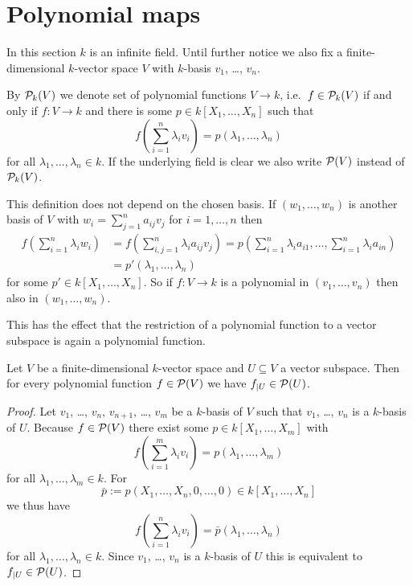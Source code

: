




\section{Polynomial maps}


In this section $k$ is an infinite field. Until further notice we also fix a finite-dimensional $k$-vector space $V$ with $k$-basis $v_1$, \dots, $v_n$.


\begin{defi}
 By $\mathcal{P}_k(V)$ we denote set of polynomial functions $V \to k$, i.e.\ $f \in \mathcal{P}_k(V)$ if and only if $f \colon V \to k$ and there is some $p \in k[X_1, \dotsc, X_n]$ such that
 \[
  f\left( \sum_{i=1}^n \lambda_i v_i \right) = p(\lambda_1, \dotsc, \lambda_n)
 \]
 for all $\lambda_1, \dotsc, \lambda_n \in k$. If the underlying field is clear we also write $\mathcal{P}(V)$ instead of $\mathcal{P}_k(V)$.
\end{defi}


This definition does not depend on the chosen basis. If $(w_1, \dotsc, w_n)$ is another basis of $V$ with $w_i = \sum_{j=1}^n a_{ij} v_j$ for $i = 1, \dotsc, n$ then
\begin{align*}
 f\left( \sum_{i=1}^n \lambda_i w_i \right)
 &= f\left( \sum_{i,j=1}^n \lambda_i a_{ij} v_j \right)
 = p\left( \sum_{i=1}^n \lambda_i a_{i1}, \dotsc, \sum_{i=1}^n \lambda_{i} a_{in} \right)\\
 &= p'(\lambda_1, \dotsc, \lambda_n)
\end{align*}
for some $p' \in k[X_1, \dotsc, X_n]$. So if $f \colon V \to k$ is a polynomial in $(v_1, \dotsc, v_n)$ then also in $(w_1, \dotsc, w_n)$.

This has the effect that the restriction of a polynomial function to a vector subspace is again a polynomial function.

\begin{lem}
 Let $V$ be a finite-dimensional $k$-vector space and $U \subseteq V$ a vector subspace. Then for every polynomial function $f \in \mathcal{P}(V)$ we have $f_{|U} \in \mathcal{P}(U)$.
\end{lem}
\begin{proof}
 Let $v_1$, \dots, $v_n$, $v_{n+1}$, \dots, $v_m$ be a $k$-basis of $V$ such that $v_1$, \dots, $v_n$ is a $k$-basis of $U$. Because $f \in \mathcal{P}(V)$ there exist some $p \in k[X_1, \dotsc, X_m]$ with
 \[
  f\left( \sum_{i=1}^m \lambda_i v_i \right) = p(\lambda_1, \dotsc, \lambda_m)
 \]
 for all $\lambda_1, \dotsc, \lambda_m \in k$. For
 \[
  \bar{p} := p(X_1, \dotsc, X_n, 0, \dotsc, 0) \in k[X_1, \dotsc, X_n]
 \]
 we thus have
 \[
  f\left( \sum_{i=1}^n \lambda_i v_i \right) = \bar{p}(\lambda_1, \dotsc, \lambda_n)
 \]
 for all $\lambda_1, \dotsc, \lambda_n \in k$. Since $v_1$, \dots, $v_n$ is a $k$-basis of $U$ this is equivalent to $f_{|U} \in \mathcal{P}(U)$.
\end{proof}


